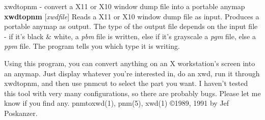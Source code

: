 %

\newpage
%

xwdtopnm - convert a X11 or X10 window dump file into a portable anymap
{\bf xwdtopnm}
{\rm [}{\it xwdfile}{\rm ]}
Reads a X11 or X10 window dump file as input.
Produces a portable anymap as output.
The type of the output file depends on the input file - if it's
black \& white, a
{\it pbm}
file is written, else if it's grayscale a
{\it pgm}
file, else a
{\it ppm}
file.  The program tells you which type it is writing.
\par
Using this program, you can convert anything on an X workstation's screen
into an anymap.
Just display whatever you're interested in, do an xwd, run it through
xwdtopnm, and then use pnmcut to select the part you want.
I haven't tested this tool with very many configurations, so there are
probably bugs.
Please let me know if you find any.
pnmtoxwd(1), pnm(5), xwd(1)
\copyright 1989, 1991 by Jef Poskanzer.
%
 
%

\newpage
%


